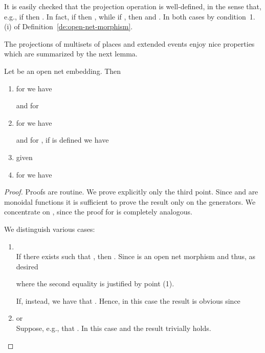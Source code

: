 \documentclass{LMCS}
\begin{document}
It is easily checked that the projection operation is
well-defined, in the sense that, e.g., if 
then . In fact, if  then , while if , then 
and . In both cases  by condition~1.(i) of
Definition~\ref{de:open-net-morphism}.

 
The projections of multisets of places and extended events enjoy nice
properties which are summarized by the next lemma.

\begin{lem}
  \label{le:proj-prop}
  Let  be an open net embedding. Then
  
  \begin{enumerate}[\em(1)]

  \item for  we have
    
    and for  
    
    
  \item for  we have
    
    and for , 
    if  is defined we have
     

  \item given 
    

  \item for  we have 
    
  \end{enumerate}
\end{lem}

\begin{proof}
  Proofs are routine. We prove explicitly only the third point. Since
   and  are monoidal functions it is sufficient to prove
  the result only on the generators.  We concentrate on , since
  the proof for  is completely analogous.

  We distinguish various cases:

  \begin{enumerate}[]

  \item \\
    If there exists  such that , then . Since  is an open net morphism  and
    thus, as desired
    \begin{quote}
      
    \end{quote}
    where the second equality is justified by point (1).
    
    If, instead,  we have that 
    .
    Hence, in this case the result is obvious since
    \begin{quote}
      
    \end{quote}
    
    
  \item  or \\
    Suppose, e.g., that . In this case  and the result trivially holds.
  \end{enumerate}
\end{proof}
\end{document}
